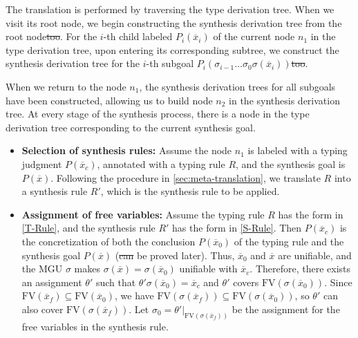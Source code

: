 \documentclass[manuscript,screen]{acmart}
\makeatletter
\newcommand{\mvhzc}{\text{FV}}
\providecommand{\DIFadd}[1]{{\protect\color{blue}\uwave{#1}}} %
\providecommand{\DIFdel}[1]{{\protect\color{red}\sout{#1}}} %
\providecommand{\DIFaddbegin}{} %
\providecommand{\DIFaddend}{} %
\providecommand{\DIFdelbegin}{} %
\providecommand{\DIFdelend}{} %
\providecommand{\DIFscaledelfig}{0.5}
\newlength{\DIFdelgraphicswidth} %
\newlength{\DIFdelgraphicsheight} %
\providecommand{\DIFaddincludegraphics}[2][]{{\color{blue}\fbox{\DIFOincludegraphics[#1]{#2}}}} %
\providecommand{\DIFdelincludegraphics}[2][]{%
\sbox{\DIFdelgraphicsbox}{\DIFOincludegraphics[#1]{#2}}%
\settoboxwidth{\DIFdelgraphicswidth}{\DIFdelgraphicsbox} %
\settoboxtotalheight{\DIFdelgraphicsheight}{\DIFdelgraphicsbox} %
\scalebox{\DIFscaledelfig}{%
\parbox[b]{\DIFdelgraphicswidth}{\usebox{\DIFdelgraphicsbox}\\[-\baselineskip] \rule{\DIFdelgraphicswidth}{0em}}\llap{\resizebox{\DIFdelgraphicswidth}{\DIFdelgraphicsheight}{%
\setlength{\unitlength}{\DIFdelgraphicswidth}%
\begin{picture}(1,1)%
\thicklines\linethickness{2pt} %
{\color[rgb]{1,0,0}\put(0,0){\framebox(1,1){}}}%
{\color[rgb]{1,0,0}\put(0,0){\line( 1,1){1}}}%
{\color[rgb]{1,0,0}\put(0,1){\line(1,-1){1}}}%
\end{picture}%
}\hspace*{3pt}}} %
} %
\DeclareRobustCommand{\DIFaddbegin}{\DIFOaddbegin \let\includegraphics\DIFaddincludegraphics} %
\DeclareRobustCommand{\DIFaddend}{\DIFOaddend \let\includegraphics\DIFOincludegraphics} %
\DeclareRobustCommand{\DIFdelbegin}{\DIFOdelbegin \let\includegraphics\DIFdelincludegraphics} %
\DeclareRobustCommand{\DIFdelend}{\DIFOaddend \let\includegraphics\DIFOincludegraphics} %
\let\sout@orig\sout %
\renewcommand{\sout}[1]{\ifmmode\text{\sout@orig{\ensuremath{#1}}}\else\sout@orig{#1}\fi} %
\makeatother
\begin{document}
The translation is performed by traversing the type derivation tree. When we visit its root node, we \DIFaddbegin \DIFadd{also }\DIFaddend begin constructing the synthesis derivation tree from the root node\DIFdelbegin \DIFdel{too}\DIFdelend . 
For the $i$-th child labeled $P_i(\overline{x}_i)$ of the current node $n_1$ in the type derivation tree, upon entering its corresponding subtree, we construct the synthesis derivation tree for the $i$-th subgoal $P_i(\sigma_{i-1} \ldots \sigma_0 \sigma(\overline{x}_i))$\DIFdelbegin \DIFdel{too}\DIFdelend .

When we return to the node $n_1$, the synthesis derivation trees for all subgoals have been constructed, allowing us to build node $n_2$ in the synthesis derivation tree. At every stage of the synthesis process, there is a node in the type derivation tree corresponding to the current synthesis goal.

\begin{itemize}
  \item \textbf{Selection of synthesis rules:}  
  Assume the node $n_1$ is labeled with a typing judgment $P(\overline{x}_c)$, annotated with a typing rule $R$, and the synthesis goal is $P(\overline{x})$. Following the procedure in \autoref{sec:meta-translation}, we translate $R$ into a synthesis rule $R'$, which is the synthesis rule to be applied.

  \item \textbf{Assignment of free variables:}  
    Assume the typing rule $R$ has the form in \autoref{T-Rule}, and the synthesis rule $R'$ has the form in \autoref{S-Rule}. 
    Then $P(\overline{x}_c)$ is the concretization of both the conclusion $P(\overline{x}_0)$ of the typing rule and the synthesis goal $P(\overline{x})$ (\DIFdelbegin \DIFdel{can }\DIFdelend \DIFaddbegin \DIFadd{as will }\DIFaddend be proved later). 
    Thus, $\overline{x}_0$ and $\overline{x}$ are unifiable, and the MGU $\sigma$ makes $\sigma(\overline{x}) = \sigma(\overline{x}_0)$ unifiable with $\overline{x}_c$. Therefore, there exists an assignment $\theta'$ such that $\theta'\sigma(\overline{x}_0) = \overline{x}_c$ and $\theta'$ covers $\mvhzc(\sigma(\overline{x}_0))$. Since $\mvhzc(\overline{x}_f) \subseteq \mvhzc(\overline{x}_0)$, we have $\mvhzc(\sigma(\overline{x}_f)) \subseteq \mvhzc(\sigma(\overline{x}_0))$, so $\theta'$ can also cover $\mvhzc(\sigma(\overline{x}_f))$. Let $\sigma_0 = \theta'|_{\mvhzc(\sigma(\overline{x}_f))}$ be the assignment for the free variables in the synthesis rule.
\end{itemize}
\end{document}
